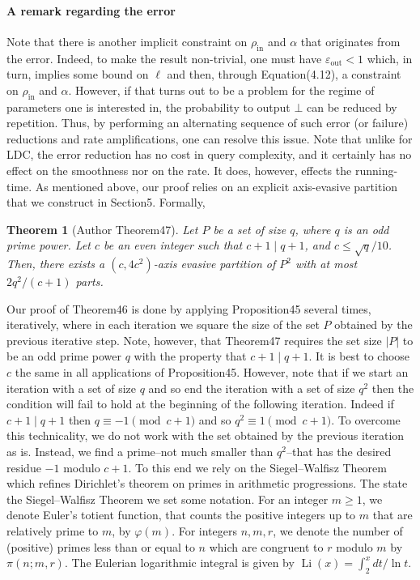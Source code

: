 \documentclass[10pt,a4paper]{article}
\newtheorem{nttheorem}{Theorem}
\begin{document}
\paragraph{A remark regarding the error}
Note that there is another implicit constraint on $\rho_{\mathrm{in}}$ and $\alpha$ that originates from the error. Indeed, to make the result non-trivial, one must have $\varepsilon_{\mathrm{out}}<1$ which, in turn, implies some bound on $\ell$ and then, through Equation(4.12), a constraint on $\rho_{\mathrm{in}}$ and $\alpha$. However, if that turns out to be a problem for the regime of parameters one is interested in, the probability to output $\bot$ can be reduced by repetition. Thus, by performing an alternating sequence of such error (or failure) reductions and rate amplifications, one can resolve this issue. Note that unlike for LDC, the error reduction has no cost in query complexity, and it certainly has no effect on the smoothness nor on the rate. It does, however, effects the running-time.
As mentioned above, our proof relies on an explicit axis-evasive partition that we construct in Section5. Formally,
\setcounter{nttheorem}{46}
\begin{nttheorem}[Author Theorem47]
Let $P$ be a set of size $q$, where $q$ is an odd prime power. Let $c$ be an even integer such that $c+1\mid q+1$, and $c\leq\sqrt q/10$. Then, there exists a $(c,4c^2)$-axis evasive partition of $P^2$ with at most $2q^2/(c+1)$ parts.
\end{nttheorem}
Our proof of Theorem46 is done by applying Proposition45 several times, iteratively, where in each iteration we square the size of the set $P$ obtained by the previous iterative step. Note, however, that Theorem47 requires the set size $|P|$ to be an odd prime power $q$ with the property that $c+1\mid q+1$. It is best to choose $c$ the same in all applications of Proposition45. However, note that if we start an iteration with a set of size $q$ and so end the iteration with a set of size $q^2$ then the condition will fail to hold at the beginning of the following iteration. Indeed if $c+1\mid q+1$ then $q\equiv-1\pmod{c+1}$ and so $q^2\equiv1\pmod{c+1}$. To overcome this technicality, we do not work with the set obtained by the previous iteration as is. Instead, we find a prime--not much smaller than $q^2$--that has the desired residue $-1$ modulo $c+1$. To this end we rely on the Siegel--Walfisz Theorem~\cite{ref34,ref37} which refines Dirichlet's theorem on primes in arithmetic progressions. The state the Siegel--Walfisz Theorem we set some notation. For an integer $m\geq1$, we denote Euler's totient function, that counts the positive integers up to $m$ that are relatively prime to $m$, by $\varphi(m)$. For integers $n,m,r$, we denote the number of (positive) primes less than or equal to $n$ which are congruent to $r$ modulo $m$ by $\pi(n;m,r)$. The Eulerian logarithmic integral is given by $\operatorname{Li}(x)=\int_2^x dt/\ln t$.
\end{document}
